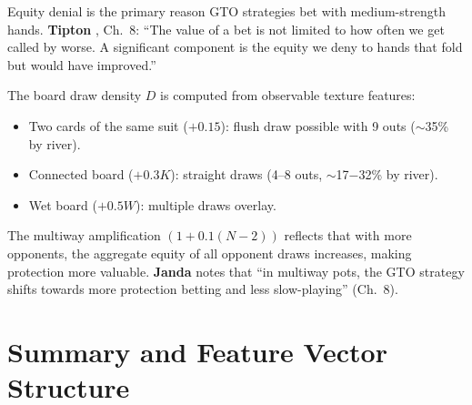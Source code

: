 \documentclass[11pt, a4paper]{article}
\theoremstyle{definition}
\begin{document}
\begin{refbox}
Equity denial is the primary reason GTO strategies bet with medium-strength hands. \textbf{Tipton} \cite{tipton2019}, Ch.~8: ``The value of a bet is not limited to how often we get called by worse. A significant component is the equity we deny to hands that fold but would have improved.''

The board draw density $D$ is computed from observable texture features:
\begin{itemize}
    \item Two cards of the same suit ($+0.15$): flush draw possible with 9 outs ($\sim$35\% by river).
    \item Connected board ($+0.3K$): straight draws (4--8 outs, $\sim$17$-$32\% by river).
    \item Wet board ($+0.5W$): multiple draws overlay.
\end{itemize}

The multiway amplification $(1 + 0.1(N-2))$ reflects that with more opponents, the aggregate equity of all opponent draws increases, making protection more valuable. \textbf{Janda} \cite{janda2017} notes that ``in multiway pots, the GTO strategy shifts towards more protection betting and less slow-playing'' (Ch.~8).
\end{refbox}

\section{Summary and Feature Vector Structure}
\end{document}
